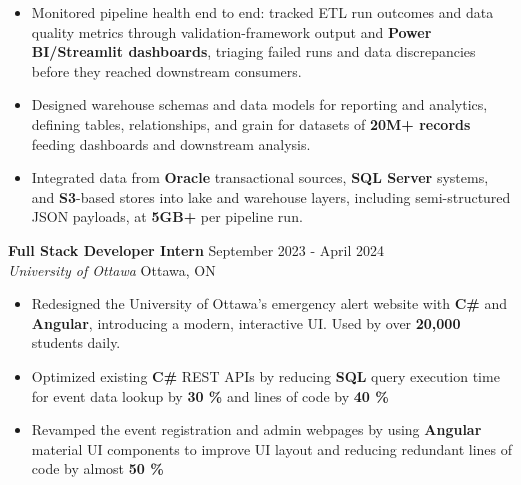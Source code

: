 \documentclass[a4paper]{article}
\begin{document}
\begin{itemize}
\item Monitored pipeline health end to end: tracked ETL run outcomes and data quality metrics through validation-framework output and \textbf{Power BI/Streamlit dashboards}, triaging failed runs and data discrepancies before they reached downstream consumers.

\item Designed warehouse schemas and data models for reporting and analytics, defining tables, relationships, and grain for datasets of \textbf{20M+ records} feeding dashboards and downstream analysis.

\item Integrated data from \textbf{Oracle} transactional sources, \textbf{SQL Server} systems, and \textbf{S3}-based stores into lake and warehouse layers, including semi-structured JSON payloads, at \textbf{5GB+} per pipeline run.

\end{itemize}

\textbf{Full Stack Developer Intern } \hfill September 2023 - April 2024\\
\textit{University of Ottawa} \hfill Ottawa, ON\\
\vspace{-2mm}
\begin{itemize} \itemsep -4pt \topsep 0pt
    \item Redesigned the University of Ottawa's emergency alert website with \textbf{C\#} and \textbf{Angular}, introducing a modern, interactive UI. Used by over \textbf{20,000} students daily.
     \item Optimized existing \textbf{C\#} REST APIs by reducing \textbf{SQL} query execution time for event data lookup by \textbf{30 \%} and lines of code by \textbf{40 \%}
    \item Revamped the event registration and admin webpages by using \textbf{Angular} material UI components to improve UI layout and reducing redundant lines of code by almost \textbf{50 \%}
\end{itemize}
\end{document}
